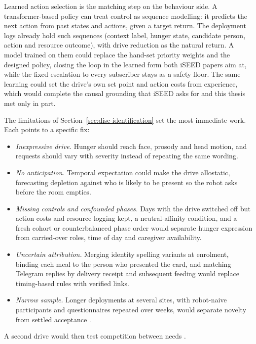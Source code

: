 Learned action selection is the matching step on the behaviour side. A transformer-based policy can treat control as sequence modelling: it predicts the next action from past states and actions, given a target return. The deployment logs already hold such sequences (context label, hunger state, candidate person, action and resource outcome), with drive reduction as the natural return. A model trained on them could replace the hand-set priority weights and the designed policy, closing the loop in the learned form both iSEED papers aim at, while the fixed escalation to every subscriber stays as a safety floor. The same learning could set the drive's own set point and action costs from experience, which would complete the causal grounding that iSEED asks for and this thesis met only in part.

The limitations of Section~\ref{sec:disc-identification} set the most immediate work. Each points to a specific fix:
\begin{itemize}
    \item \emph{Inexpressive drive.} Hunger should reach face, prosody and head motion, and requests should vary with severity instead of repeating the same wording.
    \item \emph{No anticipation.} Temporal expectation could make the drive allostatic, forecasting depletion against who is likely to be present so the robot asks before the room empties.
    \item \emph{Missing controls and confounded phases.} Days with the drive switched off but action costs and resource logging kept, a neutral-affinity condition, and a fresh cohort or counterbalanced phase order would separate hunger expression from carried-over roles, time of day and caregiver availability.
    \item \emph{Uncertain attribution.} Merging identity spelling variants at enrolment, binding each meal to the person who presented the card, and matching Telegram replies by delivery receipt and subsequent feeding would replace timing-based rules with verified links.
    \item \emph{Narrow sample.} Longer deployments at several sites, with robot-naive participants and questionnaires repeated over weeks, would separate novelty from settled acceptance \citep{DeGraaf2016LongTermAcceptance}.\end{itemize}
A second drive would then test competition between needs \citep{Rosado2022DriveCompetition}.
